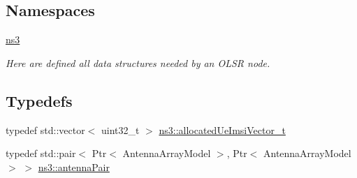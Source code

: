 \subsection*{Namespaces}
\begin{DoxyCompactItemize}
\item 
 \hyperlink{namespacens3}{ns3}
\begin{DoxyCompactList}\small\item\em Here are defined all data structures needed by an O\+L\+SR node. \end{DoxyCompactList}\end{DoxyCompactItemize}
\subsection*{Typedefs}
\begin{DoxyCompactItemize}
\item 
typedef std\+::vector$<$ uint32\+\_\+t $>$ \hyperlink{namespacens3_ab7ece31004717646a48bf2d49f366cb3}{ns3\+::allocated\+Ue\+Imsi\+Vector\+\_\+t}
\item 
typedef std\+::pair$<$ Ptr$<$ Antenna\+Array\+Model $>$, Ptr$<$ Antenna\+Array\+Model $>$ $>$ \hyperlink{namespacens3_aa7da494dc75bd8e5232a27429c48a195}{ns3\+::antenna\+Pair}
\end{DoxyCompactItemize}
